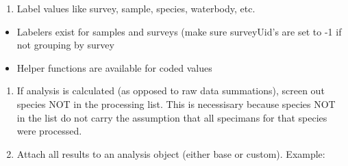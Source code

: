 \documentclass[
  letterpaper,
  DIV=11,
  numbers=noendperiod]{scrreprt}
\providecommand{\tightlist}{%
  \setlength{\itemsep}{0pt}\setlength{\parskip}{0pt}}\usepackage{longtable,booktabs,array}
\begin{document}
\begin{enumerate}
\def\labelenumi{\arabic{enumi}.}
\setcounter{enumi}{8}
\tightlist
\item
  Label values like survey, sample, species, waterbody, etc.
\end{enumerate}

\begin{itemize}
\item
  Labelers exist for samples and surveys (make sure surveyUid's are set
  to -1 if not grouping by survey
\item
  Helper functions are available for coded values
\end{itemize}

\begin{enumerate}
\def\labelenumi{\arabic{enumi}.}
\setcounter{enumi}{9}
\item
  If analysis is calculated (as opposed to raw data summations), screen
  out species NOT in the processing list. This is necessisary because
  species NOT in the list do not carry the assumption that all specimans
  for that species were processed.
\item
  Attach all results to an analysis object (either base or custom).
  Example:
\end{enumerate}
\end{document}

